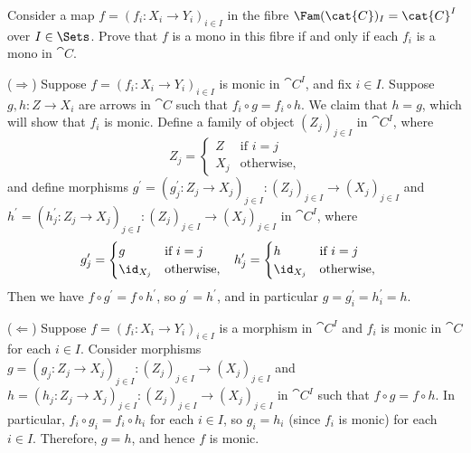 \begin{exercise}
Consider a map \(f = \left(f_i : X_i \to Y_i\right)_{i \in I}\) in the fibre \(\Fam(\cat{C})_I = \cat{C}^I\) over \(I \in \Sets\).
Prove that \(f\) is a mono in this fibre if and only if each \(f_i\) is a mono in \(\cat{C}\).
\end{exercise}

\begin{solution}
(\(\Longrightarrow\))
Suppose \(f = \left(f_i : X_i \to Y_i\right)_{i \in I}\) is monic in \(\cat{C}^I\), and fix \(i \in I\).
Suppose \(g, h : Z \to X_i\) are arrows in \(\cat{C}\) such that \(f_i \circ g = f_i \circ h\).
We claim that \(h = g\), which will show that \(f_i\) is monic.
Define a family of object \(\left(Z_j\right)_{j \in I}\) in \(\cat{C}^I\), where
\begin{equation*}
Z_j = \begin{cases}
Z & \text{if \(i = j\)} \\
X_j & \text{otherwise,}
\end{cases}
\end{equation*}
and define morphisms \(g^\prime = \left(g_j^\prime : Z_j \to X_j\right)_{j \in I} : \left(Z_j\right)_{j \in I} \to \left(X_j\right)_{j \in I}\) and \(h^\prime = \left(h_j^\prime : Z_j \to X_j\right)_{j \in I} : \left(Z_j\right)_{j \in I} \to \left(X_j\right)_{j \in I}\) in \(\cat{C}^I\), where
\begin{align*}
g_j^\prime &= \begin{cases}
g & \text{if \(i = j\)} \\
\id_{X_j} & \text{otherwise,}
\end{cases} &
h_j^\prime &= \begin{cases}
h & \text{if \(i = j\)} \\
\id_{X_j} & \text{otherwise,}
\end{cases}
\end{align*}
Then we have \(f \circ g^\prime = f \circ h^\prime\), so \(g^\prime = h^\prime\), and in particular \(g = g^\prime_i = h^\prime_i = h\).

(\(\Longleftarrow\))
Suppose \(f = \left(f_i : X_i \to Y_i\right)_{i \in I}\) is a morphism in \(\cat{C}^I\) and \(f_i\) is monic in \(\cat{C}\) for each \(i \in I\).
Consider morphisms \(g = \left(g_j : Z_j \to X_j\right)_{j \in I} : \left(Z_j\right)_{j \in I} \to \left(X_j\right)_{j \in I}\) and \(h = \left(h_j : Z_j \to X_j\right)_{j \in I} : \left(Z_j\right)_{j \in I} \to \left(X_j\right)_{j \in I}\) in \(\cat{C}^I\) such that \(f \circ g = f \circ h\).
In particular, \(f_i \circ g_i = f_i \circ h_i\) for each \(i \in I\), so \(g_i = h_i\) (since \(f_i\) is monic) for each \(i \in I\).
Therefore, \(g = h\), and hence \(f\) is monic.
\end{solution}